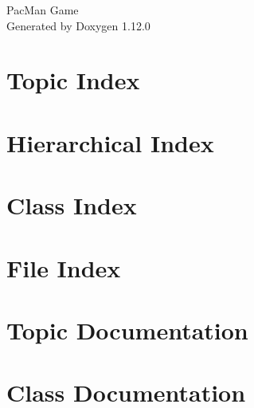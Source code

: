 \documentclass[twoside]{book}
\newcommand{\+}{\discretionary{\mbox{\scriptsize$\hookleftarrow$}}{}{}}
\newcommand{\clearemptydoublepage}{%
    \newpage{\pagestyle{empty}\cleardoublepage}%
  }
\begin{document}
  \raggedbottom
    \hypersetup{pageanchor=false,
                bookmarksnumbered=true,
                pdfencoding=unicode
               }
  \begin{titlepage}
  \vspace*{7cm}
  \begin{center}%
  {\Large Pac\+Man Game}\\
  \vspace*{1cm}
  {\large Generated by Doxygen 1.12.0}\\
  \end{center}
  \end{titlepage}
  \clearemptydoublepage
  \tableofcontents
  \clearemptydoublepage
  \hypersetup{pageanchor=true}

\chapter{Topic Index}

\chapter{Hierarchical Index}

\chapter{Class Index}

\chapter{File Index}

\chapter{Topic Documentation}





\chapter{Class Documentation}







\end{document}
